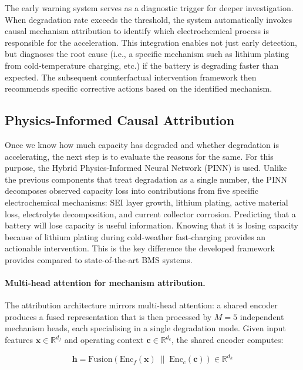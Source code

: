 \documentclass[5p,times,authoryear]{elsarticle}
\begin{document}
The early warning system serves as a diagnostic trigger for deeper investigation. When degradation rate exceeds the threshold, the system automatically invokes causal mechanism attribution to identify which electrochemical process is responsible for the acceleration. This integration enables not just early detection, but diagnoses the root cause (i.e., a specific mechanism such as lithium plating from cold-temperature charging, etc.) if the battery is degrading faster than expected. The subsequent counterfactual intervention framework then recommends specific corrective actions based on the identified mechanism.



\subsection{Physics-Informed Causal Attribution}

Once we know how much capacity has degraded and whether degradation is accelerating, the next step is to evaluate the reasons for the same. For this purpose, the Hybrid Physics-Informed Neural Network (PINN) is used. Unlike the previous components that treat degradation as a single number, the PINN decomposes observed capacity loss into contributions from five specific electrochemical mechanisms: SEI layer growth, lithium plating, active material loss, electrolyte decomposition, and current collector corrosion.
Predicting that a battery will lose capacity is useful information. Knowing that it is losing capacity because of lithium plating during cold-weather fast-charging provides an actionable intervention. This is the key difference the developed framework provides compared to state-of-the-art BMS systems.

\paragraph{Multi-head attention for mechanism attribution.}
The attribution architecture mirrors multi-head attention: a shared encoder produces a fused representation that is then processed by $M{=}5$ independent mechanism heads, each specialising in a single degradation mode. Given input features $\mathbf{x} \in \mathbb{R}^{d_f}$ and operating context $\mathbf{c} \in \mathbb{R}^{d_c}$, the shared encoder computes:

\begin{equation}
\mathbf{h} = \text{Fusion}\!\left(\text{Enc}_f(\mathbf{x})\;\|\;\text{Enc}_c(\mathbf{c})\right) \in \mathbb{R}^{d_h}
\label{eq:pinn_shared_enc}
\end{equation}
\end{document}
